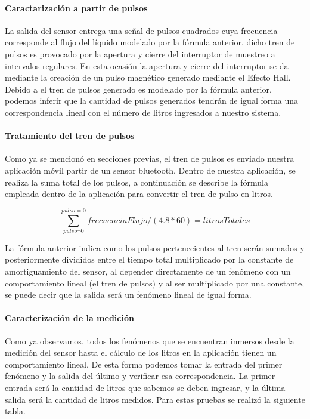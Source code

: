 \paragraph{Caractarización a partir de pulsos}
La salida del sensor entrega una señal de pulsos cuadrados cuya frecuencia corresponde al flujo del líquido modelado por la fórmula anterior, dicho tren de pulsos es provocado por la apertura y cierre del interruptor de muestreo a intervalos regulares. En esta ocasión la apertura y cierre del interruptor se da mediante la creación de un pulso magnético generado mediante el Efecto Hall.
Debido a el tren de pulsos generado es modelado por la fórmula anterior, podemos inferir que la cantidad de pulsos generados tendrán de igual forma una correspondencia lineal con el número de litros ingresados a nuestro sistema.


\paragraph{Tratamiento del tren de pulsos}
Como ya se mencionó en secciones previas, el tren de pulsos es enviado nuestra aplicación móvil partir de un sensor bluetooth. Dentro de nuestra aplicación, se realiza la suma total de los pulsos, a continuación se describe la fórmula empleada dentro de la aplicación para convertir el tren de pulso en litros.

\begin{equation}
\sum_{pulso \neg 0}^{ pulso = 0} frecuenciaFlujo / (4.8 * 60) = litrosTotales
\end{equation}

La fórmula anterior indica como los pulsos pertenecientes al tren serán sumados y posteriormente divididos entre el tiempo total multiplicado por la constante de amortiguamiento del sensor, al depender directamente de un fenómeno con un comportamiento lineal (el tren de pulsos) y al ser multiplicado por una constante, se puede decir que la salida será un fenómeno lineal de igual forma.

\paragraph{Caracterización de la medición}
Como ya observamos, todos los fenómenos que se encuentran inmersos desde la medición del sensor hasta el cálculo de los litros en la aplicación tienen un comportamiento lineal. De esta forma podemos tomar la entrada del primer fenómeno y la salida del último y verificar esa correspondencia. La primer entrada será la cantidad de litros que sabemos se deben ingresar, y la última salida será la cantidad de litros medidos. Para estas pruebas se realizó la siguiente tabla.

